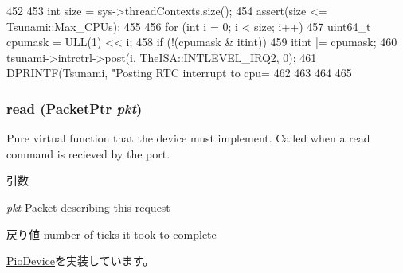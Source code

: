 \begin{DoxyCode}
452 {
453     int size = sys->threadContexts.size();
454     assert(size <= Tsunami::Max_CPUs);
455 
456     for (int i = 0; i < size; i++) {
457         uint64_t cpumask = ULL(1) << i;
458        if (!(cpumask & itint)) {
459            itint |= cpumask;
460            tsunami->intrctrl->post(i, TheISA::INTLEVEL_IRQ2, 0);
461            DPRINTF(Tsunami, "Posting RTC interrupt to cpu=%
462        }
463     }
464 
465 }
\end{DoxyCode}
\hypertarget{classTsunamiCChip_a613ec7d5e1ec64f8d21fec78ae8e568e}{
\subsubsection[{read}]{ read ({\bf PacketPtr} {\em pkt})}}
\label{classTsunamiCChip_a613ec7d5e1ec64f8d21fec78ae8e568e}
Pure virtual function that the device must implement. Called when a read command is recieved by the port. 
\begin{DoxyParams}{引数}
\item[{\em pkt}]\hyperlink{classPacket}{Packet} describing this request \end{DoxyParams}
\begin{DoxyReturn}{戻り値}
number of ticks it took to complete 
\end{DoxyReturn}


\hyperlink{classPioDevice_a842312590432036092c422c87a442358}{PioDevice}を実装しています。


